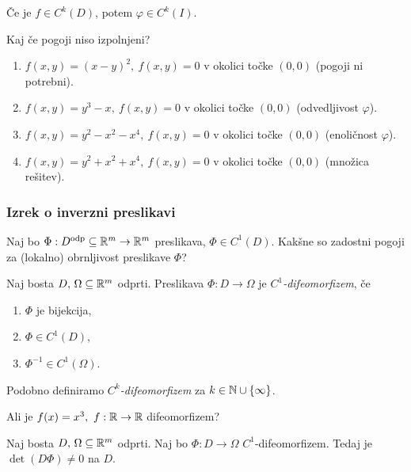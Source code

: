 \begin{opomba}
    Če je $f \in C^k(D)$, potem $\varphi \in C^k(I)$.
\end{opomba}

\begin{zgled}
    Kaj če pogoji niso izpolnjeni?
    \begin{enumerate}
        \item $f(x,y) = (x-y)^2, \ f(x,y) = 0$ v okolici točke $(0,0)$ (pogoji ni potrebni).
        \item $f(x,y) = y^3 - x, \ f(x,y) = 0$ v okolici točke $(0,0)$ (odvedljivost $\varphi$).
        \item $f(x,y) = y^2-x^2-x^4, \ f(x,y) = 0$ v okolici točke $(0,0)$ (enoličnost $\varphi$).
        \item $f(x,y) = y^2+x^2+x^4, \ f(x,y) = 0$ v okolici točke $(0,0)$ (množica rešitev).
    \end{enumerate}
\end{zgled}

\subsubsection{Izrek o inverzni preslikavi}
Naj bo $\Phi: D^\text{odp} \subseteq \mathbb{R}^m \to \mathbb{R}^m$ preslikava, $\Phi \in C^1(D)$. Kakšne so zadostni pogoji za (lokalno) obrnljivost preslikave $\Phi$?
\begin{definicija}
    Naj bosta $D, \, \Omega \subseteq \mathbb{R}^m$ odprti. Preslikava $\Phi: D  \to \Omega$ je \emph{$C^1$-difeomorfizem}, če
    \begin{enumerate}
        \item $\Phi$ je bijekcija, 
        \item $\Phi \in C^1(D)$,
        \item $\Phi^{-1} \in C^1(\Omega)$.
    \end{enumerate} 
    Podobno definiramo \emph{$C^k$-difeomorfizem} za $k \in \mathbb{N} \cup \left\{\infty\right\}$.
\end{definicija}

\begin{zgled}
    Ali je $f(x) = x^3, \ f: \mathbb{R} \to \mathbb{R}$ difeomorfizem?
\end{zgled}

\begin{trditev}
    Naj bosta $D, \, \Omega \subseteq \mathbb{R}^m$ odprti. Naj bo $\Phi: D  \to \Omega$ $C^1$-difeomorfizem. Tedaj je $\det(D\Phi) \neq 0$ na $D$. 
\end{trditev}


